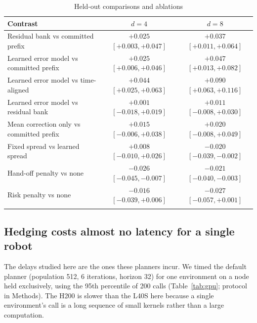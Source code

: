 \documentclass[pdflatex,sn-nature]{sn-jnl}%
\begin{document}
\begin{table}[t]
\caption{Held-out comparisons and ablations}\label{tab:heldout}
\begin{tabular*}{\textwidth}{@{\extracolsep\fill}lcc}
\toprule
Contrast & $d=4$ & $d=8$ \\
\midrule
Residual bank vs committed prefix & $+0.025$ $[+0.003, +0.047]$ & $+0.037$ $[+0.011, +0.064]$ \\
Learned error model vs committed prefix & $+0.025$ $[+0.006, +0.046]$ & $+0.047$ $[+0.013, +0.082]$ \\
Learned error model vs time-aligned & $+0.044$ $[+0.025, +0.063]$ & $+0.090$ $[+0.063, +0.116]$ \\
Learned error model vs residual bank & $+0.001$ $[-0.018, +0.019]$ & $+0.011$ $[-0.008, +0.030]$ \\
Mean correction only vs committed prefix & $+0.015$ $[-0.006, +0.038]$ & $+0.020$ $[-0.008, +0.049]$ \\
Fixed spread vs learned spread & $+0.008$ $[-0.010, +0.026]$ & $-0.020$ $[-0.039, -0.002]$ \\
Hand-off penalty vs none & $-0.026$ $[-0.045, -0.007]$ & $-0.021$ $[-0.040, -0.003]$ \\
Risk penalty vs none & $-0.016$ $[-0.039, +0.006]$ & $-0.027$ $[-0.057, +0.001]$ \\
\botrule
\end{tabular*}
\end{table}

\subsection{Hedging costs almost no latency for a single robot}\label{sec:latency}

The delays studied here are the ones these planners incur. We timed the default planner (population 512, 6 iterations, horizon 32) for one environment on a node held exclusively, using the 95th percentile of 200 calls (Table~\ref{tab:gpu}; protocol in Methods). The H200 is slower than the L40S here because a single environment's call is a long sequence of small kernels rather than a large computation.
\end{document}
